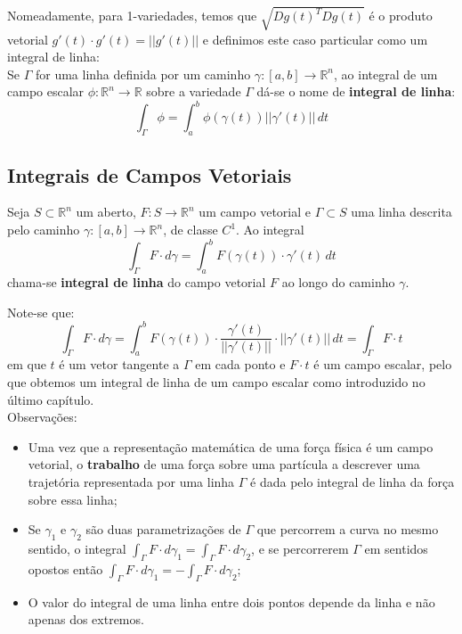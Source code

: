 \documentclass{article}
\newcommand{\R}{\mathbb{R}}
\begin{document}
Nomeadamente, para 1-variedades, temos que $\sqrt{Dg(t)^T Dg(t)}$ é o produto vetorial $g'(t) \cdot g'(t) = ||g'(t)||$ e definimos este caso particular como um integral de linha:\\
Se $\Gamma$ for uma linha definida por um caminho $\gamma : [a,b] \to \R^n$, ao integral de um campo escalar $\phi : \R^n \to \R$ sobre a variedade $\Gamma$ dá-se o nome de \textbf{integral de linha}:
$$ \int_\Gamma \phi = \int_a^b \phi(\gamma(t)) || \gamma'(t) || \, dt $$

\subsection{Integrais de Campos Vetoriais}
Seja $S \subset \R^n$ um aberto, $F: S \to \R^n$ um campo vetorial e $\Gamma \subset S$ uma linha descrita pelo caminho $\gamma: [a,b] \to \R^n$, de classe $C^1$. Ao integral
$$ \int_\Gamma F \cdot d\gamma = \int_a^b F(\gamma(t))\cdot \gamma '(t) \, dt$$
chama-se \textbf{integral de linha} do campo vetorial $F$ ao longo do caminho $\gamma$.

Note-se que:
$$ \int_\Gamma F \cdot d\gamma = \int_a^b F(\gamma(t))\cdot \frac{\gamma'(t)}{||\gamma'(t)||} \cdot ||\gamma'(t)|| \, dt = \int_\Gamma F\cdot t  $$
em que $t$ é um vetor tangente a $\Gamma$ em cada ponto e $F \cdot t$ é um campo escalar, pelo que obtemos um integral de linha de um campo escalar como introduzido no último capítulo.\\ 

Observações:
\begin{itemize}
	\item Uma vez que a representação matemática de uma força física é um campo vetorial, o \textbf{trabalho} de uma força sobre uma partícula a descrever uma trajetória representada por uma linha $\Gamma$ é dada pelo integral de linha da força sobre essa linha; 
	\item Se $\gamma_1$ e $\gamma_2$ são duas parametrizações de $\Gamma$ que percorrem a curva no mesmo sentido, o integral $\int_\Gamma F \cdot d\gamma_1 = \int_\Gamma F \cdot d\gamma_2$, e se percorrerem $\Gamma$ em sentidos opostos então $\int_\Gamma F \cdot d\gamma_1 = -\int_\Gamma F \cdot d\gamma_2$; 
	\item O valor do integral de uma linha entre dois pontos depende da linha e não apenas dos extremos.
\end{itemize}
\end{document}
